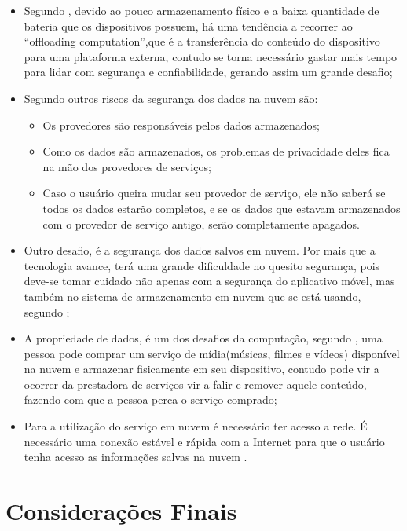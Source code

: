 \documentclass[12pt]{article}
\begin{document}
\begin{itemize}
 \item Segundo \cite{kumar2014}, devido ao pouco armazenamento físico e a baixa quantidade de bateria que os dispositivos
 possuem, há uma tendência a recorrer ao “offloading computation”,que é a transferência do conteúdo do dispositivo para uma
 plataforma externa, contudo se torna necessário gastar mais tempo para lidar com segurança e confiabilidade, gerando assim um
 grande desafio;

  \item Segundo \cite{gao13} outros riscos da segurança dos dados na nuvem são:

    \begin{itemize}
      \item Os provedores são responsáveis pelos dados armazenados;
      \item Como os dados são armazenados, os problemas de privacidade deles fica na mão dos provedores de serviços;
      \item Caso o usuário queira mudar seu provedor de serviço, ele não saberá se todos os dados estarão completos, e se os
      dados que estavam armazenados com o provedor de serviço antigo, serão completamente apagados.
    \end{itemize}


 \item Outro desafio, é a segurança dos dados salvos em nuvem. Por mais que a tecnologia avance, terá uma grande dificuldade no
 quesito segurança, pois deve-se tomar cuidado não apenas com a segurança do aplicativo móvel, mas também no sistema de
 armazenamento em nuvem que se está usando, segundo \cite{kumar2014};

 \item A propriedade de dados, é um dos desafios da computação, segundo \cite{alizadeh2013}, uma pessoa pode comprar um serviço
 de mídia(músicas, filmes e vídeos) disponível na nuvem e armazenar fisicamente em seu dispositivo, contudo pode vir a ocorrer da
 prestadora de serviços vir a falir e remover aquele conteúdo, fazendo com que a pessoa perca o serviço comprado;

 \item Para a utilização do serviço em nuvem é necessário ter acesso a rede. É necessário uma conexão estável e rápida com a
 Internet para que o usuário tenha acesso as informações salvas na nuvem \cite{alizadeh2013}.

\end{itemize}


\section{Considerações Finais}



\end{document}
